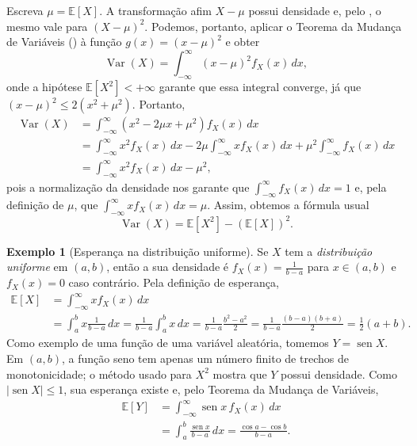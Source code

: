 \documentclass[12pt,portuguese]{article}
\theoremstyle{definition}
\newtheorem{example}[example]{Exemplo}
\theoremstyle{plainexercise}
\theoremstyle{starredexercise}
\theoremstyle{definition}
\renewcommand{\sin}{\operatorname{sen}}
\begin{document}
Escreva $\mu=\mathbb{E}[X]$. A transformação afim $X-\mu$ possui
densidade e, pelo , o mesmo vale para
$(X-\mu)^2$. Podemos, portanto, aplicar o Teorema da Mudança de
Variáveis () à função
$g(x)=(x-\mu)^2$ e obter
\[
  \operatorname{Var}(X) = \int_{-\infty}^{\infty} (x - \mu)^2 f_X(x)\,dx,
\]
onde a hipótese $\mathbb{E}[X^2]<+\infty$ garante que
essa integral converge, já que $(x - \mu)^2 \leqslant 2(x^2 + \mu^2)$. Portanto,
\[
\begin{aligned}
\operatorname{Var}(X) &= \int_{-\infty}^{\infty} (x^2 - 2\mu x + \mu^2) f_X(x)\,dx 
\\[0.3cm]
&= \int_{-\infty}^{\infty} x^2 f_X(x)\,dx - 2\mu \int_{-\infty}^{\infty} x f_X(x)\,dx + \mu^2 \int_{-\infty}^{\infty} f_X(x)\,dx 
\\[0.3cm]
&= \int_{-\infty}^{\infty} x^2 f_X(x)\,dx - \mu^2,
\end{aligned}
\]
pois a normalização da densidade nos garante que $\int_{-\infty}^{\infty} f_X(x)\,dx = 1$ e, pela definição de $\mu$, que $\int_{-\infty}^{\infty} x f_X(x)\,dx = \mu$. Assim, obtemos a fórmula usual
\begin{equation}\label{eq:variancia-formula}
  \operatorname{Var}(X) = \mathbb{E}[X^2] - (\mathbb{E}[X])^2.
\end{equation}

\begin{example}[Esperança na distribuição uniforme]\label{ex:esperanca-uniforme}
Se $X$ tem a \emph{distribuição uniforme} em $(a, b)$, 
então a sua densidade é $f_X(x) = \frac{1}{b - a}$ para 
$x \in (a, b)$ e $f_X(x) = 0$ caso contrário. Pela definição de esperança,
\[
\begin{aligned}
\mathbb{E}[X] &= \int_{-\infty}^{\infty} x f_X(x)\,dx 
\\[0.3cm]
&= \int_a^b x \frac{1}{b - a}\,dx
=
\frac{1}{b - a} \int_{a}^{b} x\, dx =
\frac{1}{b-a} \frac{b^2-a^2}{2} =
\frac{1}{b-a} \frac{(b-a)(b+a)}{2} =
\frac{1}{2}(a + b).
\end{aligned}
\]
Como exemplo de uma função de uma variável aleatória, tomemos
$Y=\sin X$. Em $(a,b)$, a função seno tem apenas um número finito de
trechos de monotonicidade; o método usado para $X^2$ mostra que $Y$
possui densidade. Como $|\sin X|\leqslant1$, sua esperança existe e,
pelo Teorema da Mudança de Variáveis,
\[
\begin{aligned}
\mathbb{E}[Y] &= \int_{-\infty}^{\infty} \sin x \, f_X(x)\,dx 
\\[0.3cm]
&= \int_a^b \frac{\sin x}{b - a}\,dx = \frac{\cos a - \cos b}{b - a}.
\end{aligned}
\]
\end{example}
\end{document}
